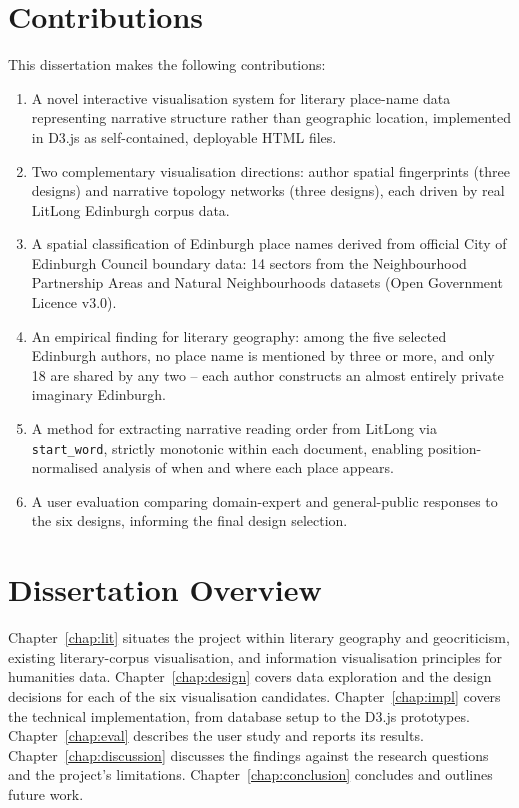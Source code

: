 \documentclass[logo,msc]{infthesis}
\begin{document}
\section{Contributions}
 
This dissertation makes the following contributions:
 
\begin{enumerate}[leftmargin=*, label=\arabic*.]
  \item A novel interactive visualisation system for literary place-name data representing narrative structure rather than geographic location, implemented in D3.js as self-contained, deployable HTML files.
  \item Two complementary visualisation directions: author spatial fingerprints (three designs) and narrative topology networks (three designs), each driven by real LitLong Edinburgh corpus data.
  \item A spatial classification of Edinburgh place names derived from official City of Edinburgh Council boundary data: 14 sectors from the Neighbourhood Partnership Areas and Natural Neighbourhoods datasets (Open Government Licence v3.0).
  \item An empirical finding for literary geography: among the five selected Edinburgh authors, no place name is mentioned by three or more, and only 18 are shared by any two -- each author constructs an almost entirely private imaginary Edinburgh.
  \item A method for extracting narrative reading order from LitLong via \texttt{start\_word}, strictly monotonic within each document, enabling position-normalised analysis of when and where each place appears.
  \item A user evaluation comparing domain-expert and general-public responses to the six designs, informing the final design selection.
\end{enumerate}
 
\section{Dissertation Overview}
 
Chapter~\ref{chap:lit} situates the project within literary geography and geocriticism, existing literary-corpus visualisation, and information visualisation principles for humanities data. Chapter~\ref{chap:design} covers data exploration and the design decisions for each of the six visualisation candidates. Chapter~\ref{chap:impl} covers the technical implementation, from database setup to the D3.js prototypes. Chapter~\ref{chap:eval} describes the user study and reports its results. Chapter~\ref{chap:discussion} discusses the findings against the research questions and the project's limitations. Chapter~\ref{chap:conclusion} concludes and outlines future work.
 
\end{document}
